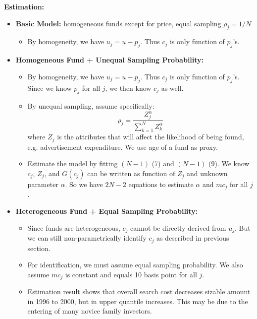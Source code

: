 \documentclass{book}
\theoremstyle{plain}
\theoremstyle{definition}
\begin{document}
\vspace{1em}
\noindent
\textbf{Estimation:}
\begin{itemize}
	\item \textbf{Basic Model:} homogeneous funds except for price, equal sampling $\rho_j=1/N$
	\begin{itemize}
		\item By homogeneity, we have $u_j = u-p_j$. Thus $c_j$ is only function of $p_j$'s.
	\end{itemize}

	\item \textbf{Homogeneous Fund + Unequal Sampling Probability:}
	\begin{itemize}
		\item By homogeneity, we have $u_j = u-p_j$. Thus $c_j$ is only function of $p_j$'s. Since we know $p_j$ for all $j$, we then know $c_j$ as well.
		\item By unequal sampling, assume specifically:
		\[\rho_j=\frac{Z_j^\alpha}{\sum_{k=1}^N{Z_k^\alpha}}\]
		where $Z_j$ is the attributes that will affect the likelihood of being found, e.g. advertisement expenditure. We use age of a fund as proxy.
		\item Estimate the model by fitting $(N-1)$ (7) and $(N-1)$ (9). We know $c_j$, $Z_j$, and $G(c_j)$ can be written as function of $Z_j$ and unknown parameter $\alpha$. So we have $2N-2$ equations to estimate $\alpha$ and $mc_j$ for all $j$.
	\end{itemize}

	\item \textbf{Heterogeneous Fund + Equal Sampling Probability:}
	\begin{itemize}
		\item Since funds are heterogeneous, $c_j$ cannot be directly derived from $u_j$. But we can still non-parametrically identify $c_j$ as described in previous section.
		\item For identification, we must assume equal sampling probability. We also assume $mc_j$ is constant and equals 10 basis point for all $j$.
		\item Estimation result shows that overall search cost decreases sizable amount in 1996 to 2000, but in upper quantile increases. This may be due to the entering of many novice family investors.
	\end{itemize}
\end{itemize}
\end{document}
